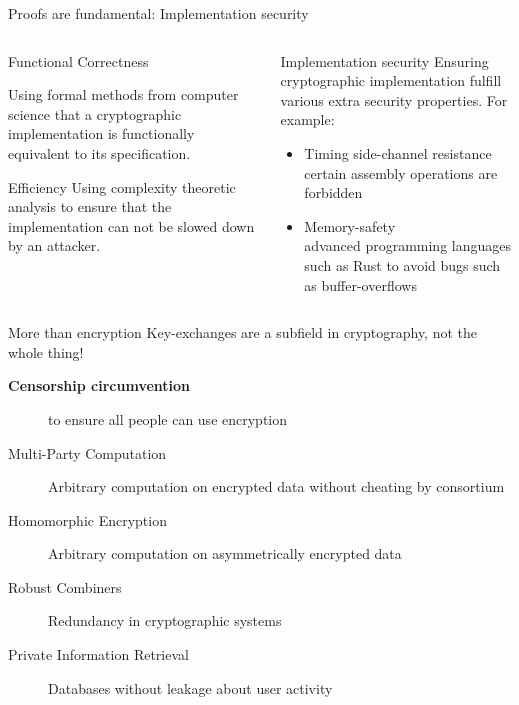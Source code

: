 
\begin{frame}{Proofs are fundamental: Implementation security}
  \begin{columns}[t]

    \begin{column}{.5\linewidth}
      \begin{block}{Functional Correctness\rule[-.5\dp\strutbox]{0pt}{.5\dp\strutbox}}%
        Using formal methods from computer science that a cryptographic implementation is functionally equivalent to its specification.
      \end{block}

      \begin{block}{Efficiency}
        Using complexity theoretic analysis to ensure that the implementation can not be slowed down by an attacker.
      \end{block}
    \end{column}

    \begin{column}{.5\linewidth}
      \begin{block}{Implementation security}
        Ensuring cryptographic implementation fulfill various extra security properties.
        For example:
        \vfill
        \begin{itemize}
          \item Timing side-channel resistance\\
          \small certain assembly operations are forbidden
          \item Memory-safety\\
          \small advanced programming languages such as Rust to avoid bugs such as buffer-overflows
        \end{itemize}
      \end{block}
    \end{column}
  \end{columns}
\end{frame}

\begin{frame}{More than encryption}
  \small
  Key-exchanges are a subfield in cryptography, not the whole thing!

  \begin{description}
    \item[\textbf{Censorship circumvention}] to ensure all people can use encryption
    \item[Multi-Party Computation] Arbitrary computation on encrypted data without cheating by consortium
    \item[Homomorphic Encryption] Arbitrary computation on asymmetrically encrypted data
    \item[Robust Combiners] Redundancy in cryptographic systems
    \item[Private Information Retrieval] Databases without leakage about user activity
  \end{description}
\end{frame}

